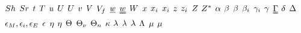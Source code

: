 \begin{mdframed}
$\sherwood$ \newline
$\strouhal$ \newline
$\timet$ \newline
$\Temp$ \newline
$\forcepot$ \newline
$\intenergy$ \newline
$\uvel$ \newline
$\vvel$ \newline
$\vol$ \newline
$\freevol$ \newline
$\vort$ \newline
$\vorttens$ \newline
$\work$ \newline
$\disp$ \newline
$\conjcoor$ \newline
$\specfrac{i}$ \newline
$\heightz$ \newline                              
$\charges$ \newline
$\compress$ \newline
$\configint$ \newline
$\tdiff$ \newline
$\boltznorm$ \newline
$\texpcoeff$ \newline
$\sexcoeff$ \newline
$\actcoeff$ \newline
$\surftens$ \newline
$\straintens$ \newline
$\blthick$ \newline
$\iipf$ \newline
$\eddydiff$ \newline
$\dielec$ \newline
$\heateffic$ \newline
$\intrinsvisc$ \newline
$\dimltemp$ \newline
$\vibrfreqfac$ \newline
$\fftcoeff$ \newline
$\comeback$ \newline
$\wavel$ \newline
$\latheat$ \newline
$\debye$ \newline
$\debroglie$ \newline
$\chempot$ \newline
$\visc$ \newline

\end{mdframed}
